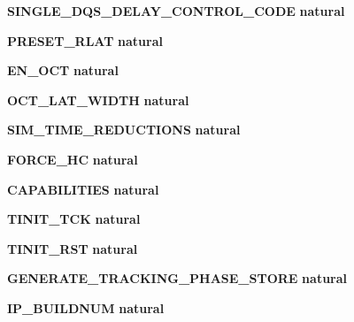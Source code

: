 \begin{DoxyCompactItemize}
\item 
{\bf S\+I\+N\+G\+L\+E\+\_\+\+D\+Q\+S\+\_\+\+D\+E\+L\+A\+Y\+\_\+\+C\+O\+N\+T\+R\+O\+L\+\_\+\+C\+O\+DE} {\bfseries {\bfseries \textcolor{comment}{natural}\textcolor{vhdlchar}{ }}}
\item 
{\bf P\+R\+E\+S\+E\+T\+\_\+\+R\+L\+AT} {\bfseries {\bfseries \textcolor{comment}{natural}\textcolor{vhdlchar}{ }}}
\item 
{\bf E\+N\+\_\+\+O\+CT} {\bfseries {\bfseries \textcolor{comment}{natural}\textcolor{vhdlchar}{ }}}
\item 
{\bf O\+C\+T\+\_\+\+L\+A\+T\+\_\+\+W\+I\+D\+TH} {\bfseries {\bfseries \textcolor{comment}{natural}\textcolor{vhdlchar}{ }}}
\item 
{\bf S\+I\+M\+\_\+\+T\+I\+M\+E\+\_\+\+R\+E\+D\+U\+C\+T\+I\+O\+NS} {\bfseries {\bfseries \textcolor{comment}{natural}\textcolor{vhdlchar}{ }}}
\item 
{\bf F\+O\+R\+C\+E\+\_\+\+HC} {\bfseries {\bfseries \textcolor{comment}{natural}\textcolor{vhdlchar}{ }}}
\item 
{\bf C\+A\+P\+A\+B\+I\+L\+I\+T\+I\+ES} {\bfseries {\bfseries \textcolor{comment}{natural}\textcolor{vhdlchar}{ }}}
\item 
{\bf T\+I\+N\+I\+T\+\_\+\+T\+CK} {\bfseries {\bfseries \textcolor{comment}{natural}\textcolor{vhdlchar}{ }}}
\item 
{\bf T\+I\+N\+I\+T\+\_\+\+R\+ST} {\bfseries {\bfseries \textcolor{comment}{natural}\textcolor{vhdlchar}{ }}}
\item 
{\bf G\+E\+N\+E\+R\+A\+T\+E\+\_\+\+T\+R\+A\+C\+K\+I\+N\+G\+\_\+\+P\+H\+A\+S\+E\+\_\+\+S\+T\+O\+RE} {\bfseries {\bfseries \textcolor{comment}{natural}\textcolor{vhdlchar}{ }}}
\item 
{\bf I\+P\+\_\+\+B\+U\+I\+L\+D\+N\+UM} {\bfseries {\bfseries \textcolor{comment}{natural}\textcolor{vhdlchar}{ }}}
\end{DoxyCompactItemize}
